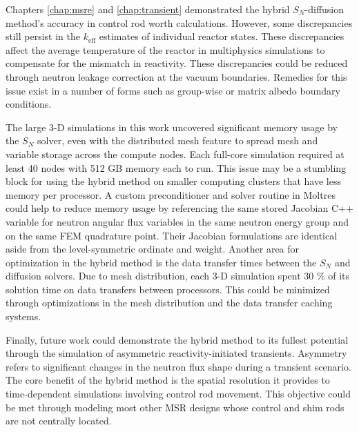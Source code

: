 Chapters \ref{chap:msre} and \ref{chap:transient} demonstrated the hybrid $S_N$-diffusion method's
accuracy in control rod worth calculations. However, some discrepancies still persist in the
$k_\text{eff}$ estimates of individual reactor states. These discrepancies affect the average
temperature of the reactor in multiphysics simulations to compensate for the mismatch in
reactivity. These discrepancies could be reduced through
neutron leakage correction at the vacuum boundaries. Remedies for this issue exist in a number of
forms such as group-wise or matrix albedo boundary conditions.

The large 3-D simulations in this work uncovered significant memory usage by the $S_N$ solver, even
with the distributed mesh feature to spread mesh and variable storage across the compute nodes.
Each full-core simulation required at least 40 nodes with 512 GB memory each to run.
This issue may be a stumbling block for using the hybrid method on smaller computing clusters that
have less memory per processor. A custom preconditioner and solver routine in Moltres could help to
reduce memory usage by referencing the same stored Jacobian C++ variable for neutron angular flux
variables in the same neutron energy group and on the same \gls{FEM} quadrature point. Their
Jacobian formulations are identical aside from the level-symmetric ordinate and weight. Another
area for optimization in the hybrid method is the data transfer times between the $S_N$ and
diffusion solvers. Due to mesh distribution, each 3-D simulation spent 30 \% of its solution time
on data transfers between processors. This could be minimized through optimizations in the mesh
distribution and the data transfer caching systems.

Finally, future work could demonstrate the hybrid method to its fullest potential through the
simulation of asymmetric reactivity-initiated transients. Asymmetry refers to significant changes
in the neutron flux shape during a transient scenario. The core benefit of the hybrid method is
the spatial resolution it provides to time-dependent simulations involving control rod movement.
This objective could be met through modeling most other \gls{MSR} designs whose control and shim
rods are not centrally located.
